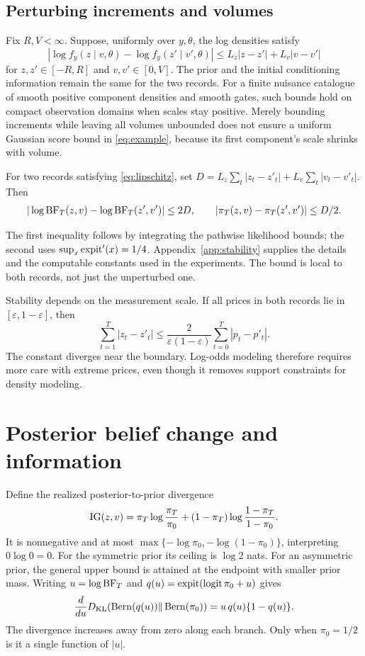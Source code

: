 \subsection{Perturbing increments and volumes}
Fix $R,V<\infty$. Suppose, uniformly over $y,\theta$, the log densities satisfy
\begin{equation}
 |\log f_y(z\mid v,\theta)-\log f_y(z'\mid v',\theta)|
 \leq L_z|z-z'|+L_v|v-v'|
 \label{eq:lipschitz}
\end{equation}
for $z,z'\in[-R,R]$ and $v,v'\in[0,V]$. The prior and the initial conditioning information remain the same for the two records. For a finite nuisance catalogue of smooth positive component densities and smooth gates, such bounds hold on compact observation domains when scales stay positive. Merely bounding increments while leaving all volumes unbounded does not ensure a uniform Gaussian score bound in \eqref{eq:example}, because its first component's scale shrinks with volume.

\begin{proposition}
\label{prop:stability}
For two records satisfying \eqref{eq:lipschitz}, set
$D=L_z\sum_t|z_t-z'_t|+L_v\sum_t|v_t-v'_t|$. Then
\begin{equation}
 |\log\mathrm{BF}_T(z,v)-\log\mathrm{BF}_T(z',v')|\leq2D,\qquad
 |\pi_T(z,v)-\pi_T(z',v')|\leq D/2.
 \label{eq:stability}
\end{equation}
\end{proposition}
The first inequality follows by integrating the pathwise likelihood bounds; the second uses $\sup_x\operatorname{expit}'(x)=1/4$. Appendix~\ref{app:stability} supplies the details and the computable constants used in the experiments. The bound is local to both records, not just the unperturbed one.

Stability depends on the measurement scale. If all prices in both records lie in $[\varepsilon,1-\varepsilon]$, then
\[
 \sum_{t=1}^T|z_t-z'_t|
 \leq\frac{2}{\varepsilon(1-\varepsilon)}\sum_{t=0}^T|p_t-p'_t|.
\]
The constant diverges near the boundary. Log-odds modeling therefore requires more care with extreme prices, even though it removes support constraints for density modeling.


\section{Posterior belief change and information}
\label{app:belief-change}
\label{sec:information}
Define the realized posterior-to-prior divergence
\begin{equation}
 \mathrm{IG}(z,v)=\pi_T\log\frac{\pi_T}{\pi_0}+(1-\pi_T)\log\frac{1-\pi_T}{1-\pi_0}.
 \label{eq:ig}
\end{equation}
It is nonnegative and at most $\max\{-\log\pi_0,-\log(1-\pi_0)\}$, interpreting $0\log0=0$. For the symmetric prior its ceiling is $\log2$ nats. For an asymmetric prior, the general upper bound is attained at the endpoint with smaller prior mass. Writing $u=\log\mathrm{BF}_T$ and $q(u)=\operatorname{expit}(\operatorname{logit}\pi_0+u)$ gives
\[
 \frac{d}{du}D_{\mathrm{KL}}(\operatorname{Bern}(q(u))\|\operatorname{Bern}(\pi_0))
 =u\,q(u)\{1-q(u)\}.
\]
The divergence increases away from zero along each branch. Only when $\pi_0=1/2$ is it a single function of $|u|$.

